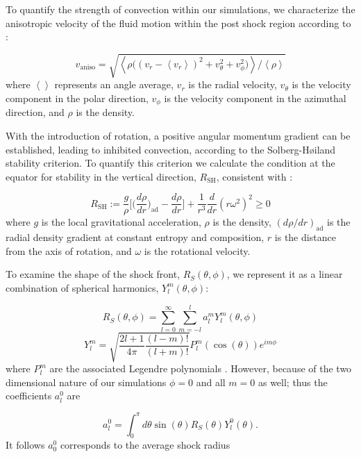 \documentclass[twocolumn,times]{aastex62}  %
\begin{document}
To quantify the strength of convection within our simulations, we characterize the anisotropic velocity of the fluid motion within the post shock region according to \citet{takiwaki:2012}:

\begin{equation}
    v_{\mathrm{aniso}} = \sqrt{\left<\rho\Big((v_r - \left<v_r\right>)^2 + v_\theta^2 + v_\phi^2\Big) \right>/\left<\rho\right>}
\label{eq:vaniso}
\end{equation}
where $\left<\right>$ represents an angle average, $v_r$ is the radial velocity, $v_\theta$ is the velocity component in the polar direction, $v_\phi$ is the velocity component in the azimuthal direction, and $\rho$ is the density.  

With the introduction of rotation, a positive angular momentum gradient can be established, leading to inhibited convection, according to the Solberg-H{\o}iland stability criterion.  To quantify this criterion we calculate the condition at the equator for stability in the vertical direction, $R_{\mathrm{SH}}$, consistent with \citet{heger:2000}:

\begin{equation}
    R_{\mathrm{SH}} := \frac{g}{\rho}\Bigg[\Bigg(\frac{d\rho}{dr}\Bigg)_{\mathrm{ad}}-\frac{d\rho}{dr}\Bigg] + \frac{1}{r^3}\frac{d}{dr}(r\omega^2)^2 \geq 0
\label{eq:SHI}
\end{equation}
where $g$ is the local gravitational acceleration, $\rho$ is the density, $(d\rho/dr)_{\mathrm{ad}}$ is the radial density gradient at constant entropy and composition, $r$ is the distance from the axis of rotation, and $\omega$ is the rotational velocity. 

To examine the shape of the shock front, $R_S(\theta,\phi)$, we represent it as a linear combination of spherical harmonics, $Y_l^m(\theta,\phi)$:

\begin{equation}
    R_S(\theta,\phi) = \sum_{l=0}^\infty \sum_{m=-l}^{l} a_l^m Y_l^m(\theta,\phi)
\end{equation}
\begin{equation}
    Y_l^m = \sqrt{\frac{2l+1}{4\pi}\frac{(l-m)!}{(l+m)!}}P_l^m(\cos(\theta)) e^{im\phi}
\end{equation}
where $P_l^m$ are the associated Legendre polynomials \citep{burrows:2012,takiwaki:2012}.  However, because of the two dimensional nature of our simulations $\phi = 0$ and all $m = 0$ as well; thus the coefficients $a_l^0$ are

\begin{equation}
    a_l^0 = \int_0^\pi d\theta \sin(\theta)R_S(\theta)Y_l^0(\theta) .
\label{eq:sho_coeff}
\end{equation}
It follows  $a_0^0$ corresponds to the average shock radius
\end{document}

